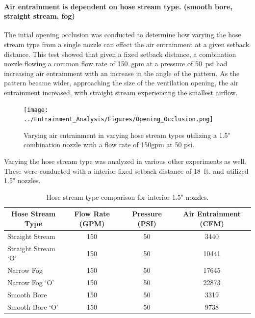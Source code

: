 \documentclass{article}
\begin{document}
\clearpage

\paragraph{Air entrainment is dependent on hose stream type. (smooth bore, straight stream, fog)} \mbox{}

The intial opening occlusion was conducted to determine how varying the hose stream type from a single nozzle can effect the air entrainment at a given setback distance. This test showed that given a fixed setback distance, a combination nozzle flowing a common flow rate of 150~gpm at a pressure of 50~psi had increasing air entrainment with an increase in the angle of the pattern. As the pattern became wider, approaching the size of the ventilation opening, the air entrainment increased, with straight stream experiencing the smallest airflow. 

\begin{figure}[!ht]
	\centering
	\texttt{[image: ../Entrainment\_Analysis/Figures/Opening\_Occlusion.png]}
	\caption{Varying air entrainment in varying hose stream types utilizing a 1.5" combination nozzle with a flow rate of 150gpm at 50 psi.}
	\label{fig:Opening_Occlusion}
\end{figure}

Varying the hose stream type was analyzed in various other experiments as well. These were conducted with a interior fixed setback distance of 18~ft. and utilized 1.5" nozzles.


\begin{table}[!ht]
\centering
\begin{tabular}{|lccc|}
\hline
\multicolumn{1}{|c|}{\textbf{Hose Stream Type}} & \multicolumn{1}{c|}{\textbf{Flow Rate (GPM)}} & \multicolumn{1}{c|}{\textbf{Pressure (PSI)}} & \textbf{Air Entrainment (CFM)} \\ \hline
Straight Stream & 150 & 50 & 3440 \\
Straight Stream `O' & 150 & 50 & 10441 \\
Narrow Fog & 150 & 50 & 17645 \\
Narrow Fog `O' & 150 & 50 & 22873 \\
Smooth Bore & 150 & 50 & 3319 \\
Smooth Bore `O' & 150 & 50 & 9738 \\ \hline
\end{tabular}
\caption{Hose stream type comparison for interior 1.5" nozzles.}
\label{Hose_Stream_Type_Comparison}
\end{table}
\end{document}
